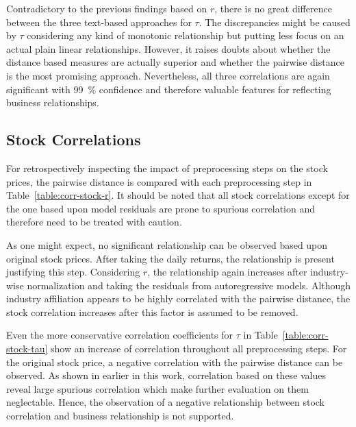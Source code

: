Contradictory to the previous findings based on $r$, there is no great difference between the three text-based approaches for $\tau$. The discrepancies might be caused by $\tau$ considering any kind of monotonic relationship but putting less focus on an actual plain linear relationships. However, it raises doubts about whether the distance based measures are actually superior and whether the pairwise distance is the most promising approach. Nevertheless, all three correlations are again significant with 99~\% confidence and therefore valuable features for reflecting business relationships.

\subsection{Stock Correlations}

For retrospectively inspecting the impact of preprocessing steps on the stock prices, the pairwise distance is compared with each preprocessing step in Table~\ref{table:corr-stock-r}. It should be noted that all stock correlations except for the one based upon model residuals are prone to spurious correlation and therefore need to be treated with caution.



As one might expect, no significant relationship can be observed based upon original stock prices. After taking the daily returns, the relationship is present justifying this step. Considering $r$, the relationship again increases after industry-wise normalization and taking the residuals from autoregressive models. Although industry affiliation appears to be highly correlated with the pairwise distance, the stock correlation increases after this factor is assumed to be removed.



Even the more conservative correlation coefficients for $\tau$ in Table~\ref{table:corr-stock-tau} show an increase of correlation throughout all preprocessing steps. For the original stock price, a negative correlation with the pairwise distance can be observed. As shown in earlier in this work, correlation based on these values reveal large spurious correlation which make further evaluation on them neglectable. Hence, the observation of a negative relationship between stock correlation and business relationship is not supported.


